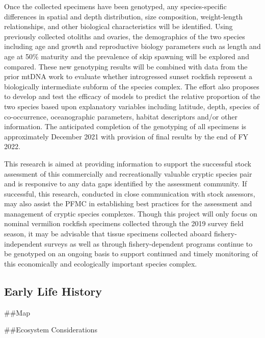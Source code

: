 \documentclass[11pt,
  english,
  a4paper,
]{article}
\begin{document}
Once the collected specimens have been genotyped, any species-specific differences in spatial and depth distribution, size composition, weight-length relationships, and other biological characteristics will be identified. Using previously collected otoliths and ovaries, the demographics of the two species including age and growth and reproductive biology parameters such as length and age at 50\% maturity and the prevalence of skip spawning will be explored and compared. These new genotyping results will be combined with data from the prior mtDNA work to evaluate whether introgressed sunset rockfish represent a biologically intermediate subform of the species complex. The effort also proposes to develop and test the efficacy of models to predict the relative proportion of the two species based upon explanatory variables including latitude, depth, species of co-occurrence, oceanographic parameters, habitat descriptors and/or other information. The anticipated completion of the genotyping of all specimens is approximately December 2021 with provision of final results by the end of FY 2022.

This research is aimed at providing information to support the successful stock assessment of this commercially and recreationally valuable cryptic species pair and is responsive to any data gaps identified by the assessment community. If successful, this research, conducted in close communication with stock assessors, may also assist the PFMC in establishing best practices for the assessment and management of cryptic species complexes. Though this project will only focus on nominal vermilion rockfish specimens collected through the 2019 survey field season, it may be advisable that tissue specimens collected aboard fishery-independent surveys as well as through fishery-dependent programs continue to be genotyped on an ongoing basis to support continued and timely monitoring of this economically and ecologically important species complex.


\hypertarget{early-life-history}{%
\subsection{Early Life History}\label{early-life-history}}

\leavevmode\tagmcend\tagstructend

\#\#Map

\#\#Ecosystem Considerations
\end{document}
